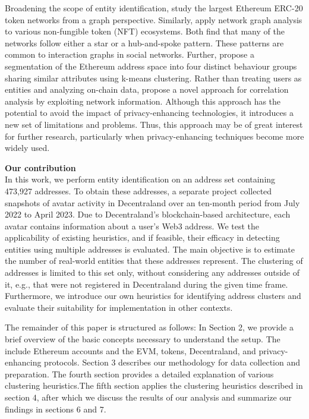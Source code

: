 \documentclass[12pt,a4paper,titlepage,oneside,english]{article}
\begin{document}
Broadening the scope of entity identification, \cite{victorlüders2019} study the largest Ethereum ERC-20 token networks from a graph perspective. Similarly, \cite{casalebrunet2021} apply network graph analysis to various non-fungible token (NFT) ecosystems. Both find that many of the networks follow either a star or a hub-and-spoke pattern. These patterns are common to interaction graphs in social networks. Further, \cite{Payette2017} propose a segmentation of the Ethereum address space into four distinct behaviour groups sharing similar attributes using k-means clustering. \newline
Rather than treating users as entities and analyzing on-chain data, \cite{yu2023} propose a novel approach for correlation analysis by exploiting network information. Although this approach has the potential to avoid the impact of privacy-enhancing technologies, it introduces a new set of limitations and problems. Thus, this approach may be of great interest for further research, particularly when privacy-enhancing techniques become more widely used.


\textbf{Our contribution}\\
In this work, we perform entity identification on an address set containing 473,927 addresses. To obtain these addresses, a separate project collected snapshots of avatar activity in Decentraland over an ten-month period from July 2022 to April 2023. Due to Decentraland's blockchain-based architecture, each avatar contains information about a user's Web3 address. 
We test the applicability of existing heuristics, and if feasible, their efficacy in detecting entities using multiple addresses is evaluated.
The main objective is to estimate the number of real-world entities that these addresses represent. The clustering of addresses is limited to this set only, without considering any %
 addresses outside of it, e.g., that were not registered in Decentraland during the given time frame.
Furthermore, we introduce our own heuristics for identifying address clusters and evaluate their suitability for implementation in other contexts.

The remainder of this paper is structured as follows: In Section 2, we provide a brief overview of the basic concepts necessary to understand the setup. The include Ethereum accounts and the EVM, tokens, Decentraland, and privacy-enhancing protocols. Section 3 describes our methodology for data collection and preparation. The fourth section provides a detailed explanation of various clustering heuristics.The fifth section applies the clustering heuristics described in section 4, after which we discuss the results of our analysis and summarize our findings in sections 6 and 7.
\end{document}
